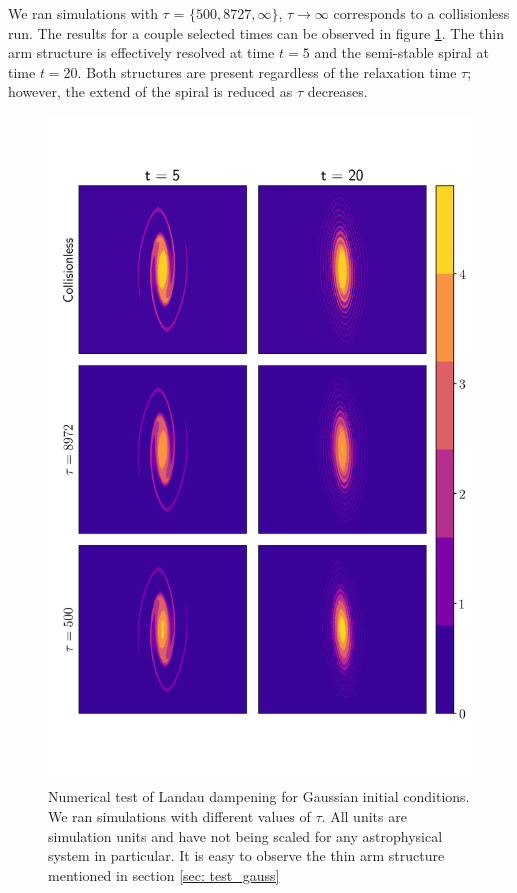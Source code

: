 \documentclass[fleqn,usenatbib]{mnras}
\begin{document}
We ran simulations with $\tau$ = $\{500,8727, \infty\}$, $\tau \rightarrow \infty$ corresponds to a collisionless run.
The results for a couple selected times can be observed in figure \ref{fig: Gauss_test}.
The thin arm structure is effectively resolved at time $t=5$ and the semi-stable spiral at time $t=20$. Both structures are present regardless of the relaxation time $\tau$; however, the extend of the spiral is reduced as $\tau$ decreases.



\begin{figure}
    \centering
    \includegraphics[scale=0.8]{images/gauss.png} %
    \caption{Numerical test of Landau dampening for Gaussian initial conditions. We ran simulations with different values of $\tau$. All units are simulation units and have not being scaled for any astrophysical system in particular. It is easy to observe the thin arm structure mentioned in section \ref{sec: test_gauss}}
    \label{fig: Gauss_test}
\end{figure}
\end{document}
